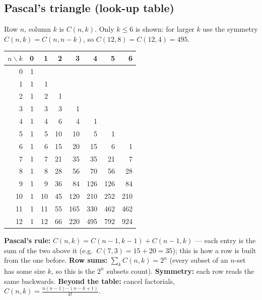 \documentclass{fkt-notes}
\theoremstyle{definition}
\begin{document}
\subsection{Pascal's triangle (look-up table)}
%
Row $n$, column $k$ is $C(n,k)$. Only $k\le6$ is shown: for larger $k$ use
the symmetry $C(n,k)=C(n,n-k)$, so $C(12,8)=C(12,4)=495$.
\begin{center}
  \small\renewcommand{\arraystretch}{1.15}
  \begin{tabular}{@{}r|rrrrrrr@{}}
    $n\backslash k$ & 0 & 1  & 2  & 3   & 4   & 5   & 6   \\\hline
    0               & 1 &    &    &     &     &     &     \\
    1               & 1 & 1  &    &     &     &     &     \\
    2               & 1 & 2  & 1  &     &     &     &     \\
    3               & 1 & 3  & 3  & 1   &     &     &     \\
    4               & 1 & 4  & 6  & 4   & 1   &     &     \\
    5               & 1 & 5  & 10 & 10  & 5   & 1   &     \\
    6               & 1 & 6  & 15 & 20  & 15  & 6   & 1   \\
    7               & 1 & 7  & 21 & 35  & 35  & 21  & 7   \\
    8               & 1 & 8  & 28 & 56  & 70  & 56  & 28  \\
    9               & 1 & 9  & 36 & 84  & 126 & 126 & 84  \\
    10              & 1 & 10 & 45 & 120 & 210 & 252 & 210 \\
    11              & 1 & 11 & 55 & 165 & 330 & 462 & 462 \\
    12              & 1 & 12 & 66 & 220 & 495 & 792 & 924 \\
  \end{tabular}
\end{center}
\begin{rulepar}
  \textbf{Pascal's rule:} $C(n,k)=C(n-1,k-1)+C(n-1,k)$ --- each entry is
  the sum of the two above it (e.g.\ $C(7,3)=15+20=35$); this is how a row
  is built from the one before. \textbf{Row sums:} $\sum_kC(n,k)=2^n$
  (every subset of an $n$-set has some size $k$, so this is the $2^n$
  subsets count). \textbf{Symmetry:} each row reads the same backwards.
  \textbf{Beyond the table:} cancel factorials, $C(n,k)=\frac{n(n-1)\cdots(n-k+1)}{k!}$.
\end{rulepar}
\end{document}
